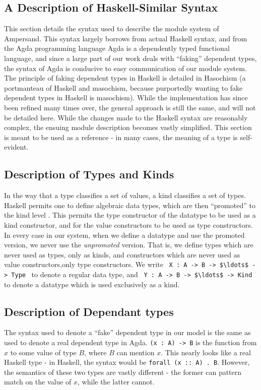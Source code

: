 \noindent
\subsection{A Description of Haskell-Similar Syntax}\label{subsec:HaskellSyntax}

This section details the syntax used to describe the module system of
Ampersand. This syntax largely borrows from actual Haskell syntax, and from the
Agda programming language%
 Agda is a dependently typed functional
language, and since a large part of our work deals with ``faking'' dependent
types, the syntax of Agda is conducive to easy communication of our module 
system. The
principle of faking dependent types in Haskell is detailed in
Hasochism \citep{hasochism} 
(a portmanteau of Haskell and masochism, because
purportedly wanting to fake dependent types in Haskell is masochism). While the
implementation has since been refined many times over, the general approach is 
still the
same, and will not be detailed here.
While the changes made to the Haskell syntax are reasonably complex, the 
ensuing 
module description becomes vastly simplified. This section is meant to be used
as a reference - in many cases, the meaning of a type is self-evident. 

\noindent
\subsection{Description of Types and Kinds}
In the way that a type classifies a set of values, a kind classifies a set of
types. Haskell permits one to define algebraic data types, which are then 
``promoted''
to the kind level \citep{promotion}. 
This permits the type constructor of the datatype to be used
as a kind constructor, and for the value constructors to be used as type 
constructors. In every case in our system, when we define a datatype and use 
the promoted version, we never use the \emph{unpromoted} version. That is, we 
define types which are never used as types, only as kinds, and constructors 
which are never used as value constructors,only type constructors. We write 
\,\,\,\lstinline!X : A -> B -> $\ldots$ -> Type!\,\,\, to denote
a regular data type, and \,\,\,\lstinline!Y : A -> B -> $\ldots$ -> Kind!\,\,\, 
to denote a datatype
which is used exclusively as a kind. 

\noindent
\subsection{Description of Dependant types}
The syntax used to denote a ``fake'' dependent type in our model is the same 
as used to denote a real dependent type in Agda. \lstinline!(x : A) -> B! is 
the function
from $x$ to some value of type $B$, where $B$ can mention $x$. This nearly 
looks like a 
real Haskell type - in Haskell, the syntax would be \texttt{forall (x :: A) . 
B}. However, 
the semantics of these two types are vastly different - the former can pattern 
match
on the value of $x$, while the latter cannot. 

